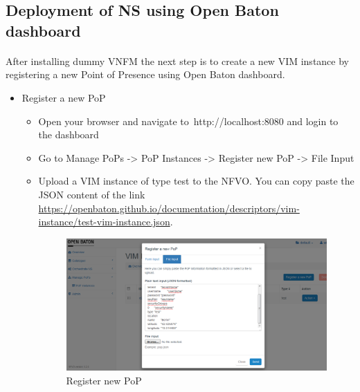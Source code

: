 			\subsection*{Deployment of NS using Open Baton dashboard}
			\paragraph{}\begin{itemize}
			After installing dummy VNFM the next step is to create a new VIM instance by registering a new Point of Presence using Open Baton dashboard.
			\begin{itemize}
				\item Register a new PoP
				\begin{itemize}
					\item Open your browser and navigate to http://localhost:8080 and login to the dashboard
					\item Go to Manage PoPs -> PoP Instances -> Register new PoP -> File Input
					\item Upload a VIM instance of type test to the NFVO. You can copy paste the JSON content of the link 	\hyperlink{name}{https://openbaton.github.io/documentation/descriptors/vim-instance/test-vim-instance.json}. 
					\begin{figure} [h]
						\centering
						\includegraphics[width=0.7\linewidth]{figures/registerPoP}
						\caption{Register new PoP}
						\label{fig:registerPoP}
					\end{figure}
				\end{itemize}
			

\end{itemize}
\end{itemize}

